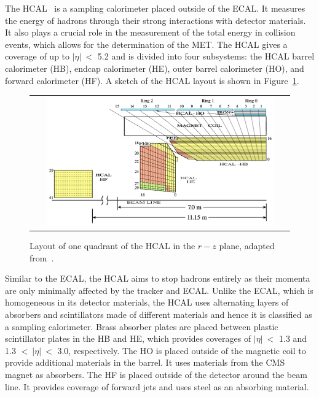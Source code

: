 The \ac{HCAL}~\cite{CMS:1997xji} is a sampling calorimeter placed outside of the \ac{ECAL}. It measures the energy of hadrons through their strong interactions with detector materials. It also plays a crucial role in the measurement of the total energy in collision events, which allows for the determination of the \ac{MET}. The \ac{HCAL} gives a coverage of up to $|\eta|~<$ 5.2 and is divided into four subsystems: the \ac{HCAL} barrel calorimeter (HB), endcap calorimeter (HE), outer barrel calorimeter (HO), and forward calorimeter (HF). A sketch of the \ac{HCAL} layout is shown in Figure~\ref{fig:HCAL}.

\begin{figure}[tbh!]
 \begin{center}
 \begin{tabular}{c}
 \includegraphics[width=0.9\textwidth]{figures/Part2/CMS/HCAL}
 \end{tabular}
 \caption{Layout of one quadrant of the \ac{HCAL} in the $r-z$ plane, adapted from~\cite{CMS:2009nwd}.}
 \label{fig:HCAL}
 \end{center}
\end{figure}

Similar to the \ac{ECAL}, the \ac{HCAL} aims to stop hadrons entirely as their momenta are only minimally affected by the tracker and \ac{ECAL}. Unlike the \ac{ECAL}, which is homogeneous in its detector materials, the \ac{HCAL} uses alternating layers of absorbers and scintillators made of different materials and hence it is classified as a sampling calorimeter. Brass absorber plates are placed between plastic scintillator plates in the HB and HE, which provides coverages of $|\eta|~<$ 1.3 and 1.3 $<~|\eta|~<$ 3.0, respectively. The HO is placed outside of the magnetic coil to provide additional materials in the barrel. It uses materials from the \ac{CMS} magnet as absorbers. The HF is placed outside of the detector around the beam line. It provides coverage of forward jets and uses steel as an absorbing material. 

